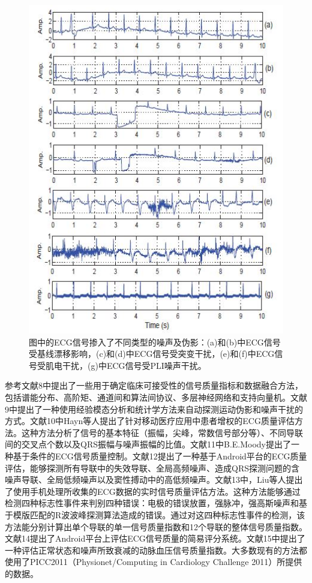\begin{figure}%
\label{figNo.1}
\includegraphics[width=0.6\columnwidth]{fig1.jpg}
\caption{
\wuhao
图中的ECG信号掺入了不同类型的噪声及伪影：(a)和(b)中ECG信号受基线漂移影响，(c)和(d)中ECG信号受突变干扰，(e)和(f)中ECG信号受肌电干扰，(g)中ECG信号受PLI噪声干扰。
}
\end{figure}
参考文献8中提出了一些用于确定临床可接受性的信号质量指标和数据融合方法，包括谱能分布、高阶矩、通道间和算法间协议、多层神经网络和支持向量机。文献9中提出了一种使用经验模态分析和统计学方法来自动探测运动伪影和噪声干扰的方式。文献10中Hayn等人提出了针对移动医疗应用中患者增权的ECG质量评估方法。这种方法分析了信号的基本特征（振幅，尖峰，常数信号部分等）、不同导联间的交叉点个数以及QRS振幅与噪声振幅的比值。文献11中B.E.Moody提出了一种基于条件的ECG信号质量控制。文献12提出了一种基于Android平台的ECG质量评估，能够探测所有导联中的失效导联、全局高频噪声、造成QRS探测问题的含噪声导联、全局低频噪声以及窦性搏动中的高低频噪声。文献13中，Liu等人提出了使用手机处理所收集的ECG数据的实时信号质量评估方法。这种方法能够通过检测四种标志性事件来判别四种错误：电极的错误放置，强脉冲，强高斯噪声和基于模版匹配的R波波峰探测算法造成的错误。通过对这四种标志性事件的检测，该方法能分别计算出单个导联的单一信号质量指数和12个导联的整体信号质量指数。文献14提出了Android平台上评估ECG信号质量的简易评分系统。文献15中提出了一种评估正常状态和噪声所致衰减的动脉血压信号质量指数。大多数现有的方法都使用了PICC2011（Physionet/Computing in Cardiology Challenge 2011）所提供的数据。


